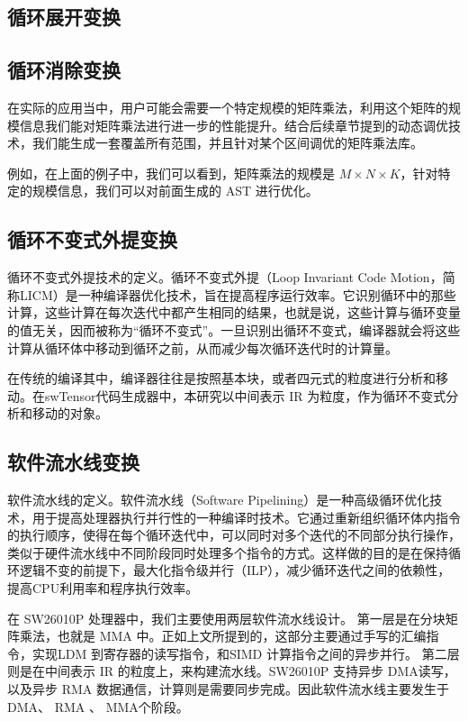 \subsection{循环展开变换}

\subsection{循环消除变换}

在实际的应用当中，用户可能会需要一个特定规模的矩阵乘法，利用这个矩阵的规模信息我们能对矩阵乘法进行进一步的性能提升。结合后续章节提到的动态调优技术，我们能生成一套覆盖所有范围，并且针对某个区间调优的矩阵乘法库。

例如，在上面的例子中，我们可以看到，矩阵乘法的规模是 $M \times N \times K$，针对特定的规模信息，我们可以对前面生成的 AST 进行优化。

\subsection{循环不变式外提变换}

循环不变式外提技术的定义。循环不变式外提（Loop Invariant Code Motion，简称LICM）是一种编译器优化技术，旨在提高程序运行效率。它识别循环中的那些计算，这些计算在每次迭代中都产生相同的结果，也就是说，这些计算与循环变量的值无关，因而被称为“循环不变式”。一旦识别出循环不变式，编译器就会将这些计算从循环体中移动到循环之前，从而减少每次循环迭代时的计算量。

在传统的编译其中，编译器往往是按照基本块，或者四元式的粒度进行分析和移动。在swTensor代码生成器中，本研究以中间表示 IR 为粒度，作为循环不变式分析和移动的对象。



\subsection{软件流水线变换}

软件流水线的定义。软件流水线（Software Pipelining）是一种高级循环优化技术，用于提高处理器执行并行性的一种编译时技术。它通过重新组织循环体内指令的执行顺序，使得在每个循环迭代中，可以同时对多个迭代的不同部分执行操作，类似于硬件流水线中不同阶段同时处理多个指令的方式。这样做的目的是在保持循环逻辑不变的前提下，最大化指令级并行（ILP），减少循环迭代之间的依赖性，提高CPU利用率和程序执行效率。

在 SW26010P 处理器中，我们主要使用两层软件流水线设计。
第一层是在分块矩阵乘法，也就是 MMA 中。正如上文所提到的，这部分主要通过手写的汇编指令，实现LDM 到寄存器的读写指令，和SIMD 计算指令之间的异步并行。
第二层则是在中间表示 IR 的粒度上，来构建流水线。SW26010P 支持异步 DMA读写，以及异步 RMA 数据通信，计算则是需要同步完成。因此软件流水线主要发生于DMA、 RMA 、 MMA个阶段。




